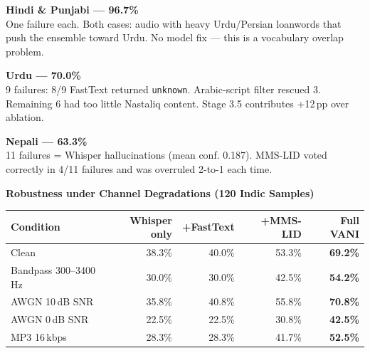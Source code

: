 \documentclass[11pt,a4paper]{article}
\begin{document}
\noindent
\begin{minipage}[t]{0.32\textwidth}
\begin{tcolorbox}[enhanced,colback=LGreen,colframe=DGreen,arc=5pt,boxrule=1.5pt,
  left=6pt,right=6pt,top=6pt,bottom=6pt]
\textbf{\color{DGreen}Hindi \& Punjabi --- 96.7\%}\\[3pt]
\small One failure each. Both cases: audio with heavy Urdu/Persian loanwords that push the ensemble toward Urdu. No model fix --- this is a vocabulary overlap problem.
\end{tcolorbox}
\end{minipage}\hfill
\begin{minipage}[t]{0.32\textwidth}
\begin{tcolorbox}[enhanced,colback=LAmber,colframe=Amber,arc=5pt,boxrule=1.5pt,
  left=6pt,right=6pt,top=6pt,bottom=6pt]
\textbf{\color{Amber}Urdu --- 70.0\%}\\[3pt]
\small 9 failures: 8/9 FastText returned \texttt{unknown}. Arabic-script filter rescued 3. Remaining 6 had too little Nastaliq content. Stage 3.5 contributes +12\,pp over ablation.
\end{tcolorbox}
\end{minipage}\hfill
\begin{minipage}[t]{0.32\textwidth}
\begin{tcolorbox}[enhanced,colback=LRed,colframe=DRed,arc=5pt,boxrule=1.5pt,
  left=6pt,right=6pt,top=6pt,bottom=6pt]
\textbf{\color{DRed}Nepali --- 63.3\%}\\[3pt]
\small 11 failures = Whisper hallucinations (mean conf. 0.187). MMS-LID voted correctly in 4/11 failures and was overruled 2-to-1 each time.
\end{tcolorbox}
\end{minipage}

\vspace{5pt}

\textbf{\color{Teal}\large Robustness under Channel Degradations (120 Indic Samples)}

\vspace{3pt}
{\small
\begin{tabular}{lrrrr}
\toprule
\rowcolor{Navy}
\color{white}\textbf{Condition} &
\color{white}\textbf{Whisper only} &
\color{white}\textbf{+FastText} &
\color{white}\textbf{+MMS-LID} &
\color{white}\textbf{Full VANI}\\
\midrule
Clean            & 38.3\% & 40.0\% & 53.3\% & \cellcolor{LGreen}\textbf{69.2\%}\\
Bandpass 300--3400\,Hz & 30.0\% & 30.0\% & 42.5\% & \cellcolor{LAmber}\textbf{54.2\%}\\
AWGN 10\,dB SNR  & 35.8\% & 40.8\% & 55.8\% & \cellcolor{LGreen}\textbf{70.8\%}\\
AWGN 0\,dB SNR   & 22.5\% & 22.5\% & 30.8\% & \cellcolor{LAmber}\textbf{42.5\%}\\
MP3 16\,kbps     & 28.3\% & 28.3\% & 41.7\% & \cellcolor{LAmber}\textbf{52.5\%}\\
\bottomrule
\end{tabular}
}
\end{document}

